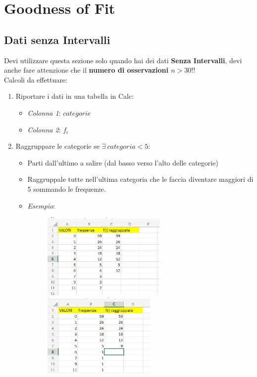 \chapter{Goodness of Fit}

\section{Dati senza Intervalli}
Devi utilizzare questa sezione solo quando hai dei dati \textbf{Senza Intervalli},
devi anche fare attenzione che il \textbf{numero di osservazioni $n > 30$}!!\\

Calcoli da effettuare:

\begin{enumerate}
    \item Riportare i dati in una tabella in Calc:
          \begin{itemize}
              \item \textit{Colonna 1}: $categorie$
              \item \textit{Colonna 2}: $f_i$
          \end{itemize}
    \item Raggruppare le categorie se $\exists \ categoria < 5$:
          \begin{itemize}
              \item Parti dall'ultimo a salire (dal basso verso l'alto delle
                    categorie)
              \item Raggruppale tutte nell'ultima categoria che le faccia
                    diventare maggiori di 5 sommando le frequenze.
              \item \textit{Esempio}:
                    \begin{figure}[H]
                        \centering
                        \includegraphics[width=6cm, keepaspectratio]{capitoli/goodnes_of_fit/imgs/vesceragay.png}
                        \includegraphics[width=5.5cm, keepaspectratio]{capitoli/goodnes_of_fit/imgs/POSTAMOLTOGAY.png}

\end{figure}
\end{itemize}
\end{enumerate}
